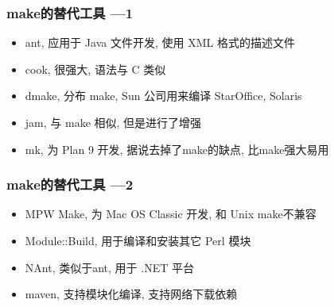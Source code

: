 \documentclass[compress]{beamer}
\begin{document}
\begin{frame}
\frametitle{make的替代工具 ---1}
\begin{itemize}
\item \alert{ant}, 应用于 Java 文件开发, 使用 XML 格式的描述文件
\item \alert{cook}, 很强大, 语法与 C 类似
\item \alert{dmake}, 分布 make, Sun 公司用来编译 StarOffice, Solaris
\item \alert{jam}, 与 make 相似, 但是进行了增强
\item \alert{mk}, 为 Plan 9 开发, 据说去掉了make的缺点, 比make强大易用
  \end{itemize}

  
\end{frame}


\begin{frame}
\frametitle{make的替代工具 ---2}
\begin{itemize}
\item \alert{MPW Make}, 为 Mac OS Classic 开发, 和 Unix \alert{make}不兼容
\item \alert{Module::Build}, 用于编译和安装其它 Perl 模块
\item \alert{NAnt}, 类似于\alert{ant}, 用于 .NET 平台
\item \alert{maven}, 支持模块化编译, 支持网络下载依赖
\end{itemize}

\end{frame}
\end{document}
